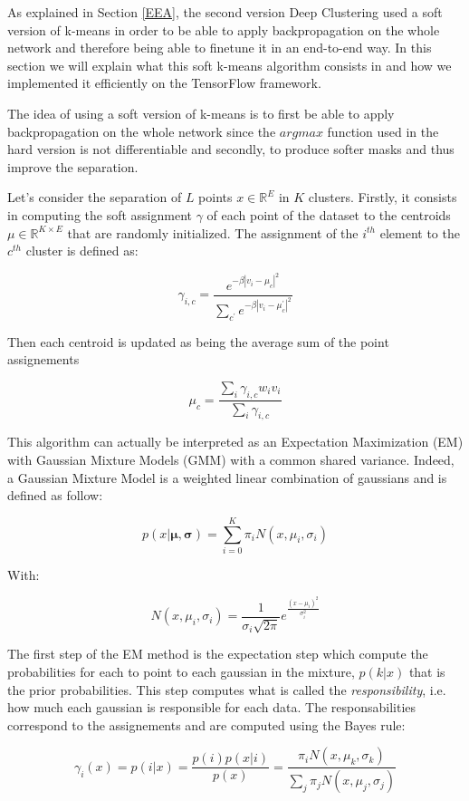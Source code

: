 \documentclass[master, tikz, final,11pt, dvipdfmx]{iscs-thesis}
\begin{document}
As explained in Section \ref{EEA}, the second version Deep Clustering used a soft version of k-means in order to be able to apply backpropagation on the whole network and therefore being able to finetune it in an end-to-end way. In this section we will explain what this soft k-means algorithm consists in and how we implemented it efficiently on the TensorFlow framework.

The idea of using a soft version of k-means is to first be able to apply backpropagation on the whole network since the $argmax$ function used in the hard version is not differentiable and secondly, to produce softer masks and thus improve the separation. 

Let's consider the separation of $L$ points $x \in \mathbb{R}^E$ in $K$ clusters. Firstly, it consists in computing the soft assignment $\gamma$ of each point of the dataset to the centroids $\mu \in \mathbb{R}^{K\times E}$ that are randomly initialized. The assignment of the $i^{th}$ element to the $c^{th}$ cluster is defined as:

\[ \gamma_{i,c} = \frac{e^{-\beta |v_i-\mu_c|^2}}{\sum_{c^\prime} e^{-\beta |v_i-\mu_c^\prime|^2}}  \]

Then each centroid is updated as being the average sum of the point assignements

\[ \mu_c = \frac{\sum_i \gamma_{i,c}w_iv_i}{\sum_i \gamma_{i,c}}  \]


This algorithm can actually be interpreted as an Expectation Maximization (EM) with Gaussian Mixture Models (GMM) with a common shared variance. Indeed, a Gaussian Mixture Model is a weighted linear combination of gaussians and is defined as follow:

\[
 p(x | \mathbf{\mu}, \mathbf{\sigma}) = \sum_{i=0}^K \pi_i N(x, \mu_i,\sigma_i)
\]

With:

\[
N(x, \mu_i,\sigma_i) = \frac{1}{\sigma_i \sqrt{2\pi}} e^{\frac{(x-\mu_i)^2}{\sigma_i^2}}
\]

The first step of the EM method is the expectation step which compute the probabilities for each to point to each gaussian in the mixture, $p(k|x)$ that is the prior probabilities. This step computes what is called the \textit{responsibility}, i.e. how much each gaussian is responsible for each data. The responsabilities correspond to the assignements and are computed using the Bayes rule:

\[
\gamma_i(x) = p(i|x) = \frac{p(i)p(x|i)}{p(x)} = \frac{\pi_i N(x, \mu_k,\sigma_k)}{\sum_j \pi_j N(x, \mu_j,\sigma_j)}
\]
\end{document}

